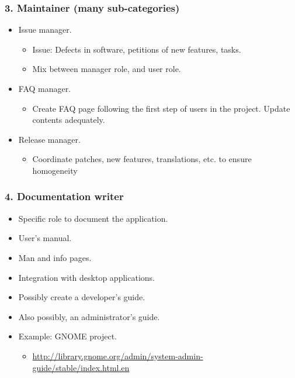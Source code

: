 \documentclass{beamer}
\begin{document}
\begin{frame}
 \frametitle{3. Maintainer (many sub-categories)}
  \begin{itemize}
   \item Issue manager.
    \begin{itemize}
    \item Issue: Defects in software, petitions of new features, tasks.
    \item Mix between manager role, and user role.
    \end{itemize}
   \item FAQ manager.
    \begin{itemize}
     \item Create FAQ page following the first step of users in the project. Update contents adequately.
    \end{itemize}
   \item Release manager.
    \begin{itemize}
     \item Coordinate patches, new features, translations, etc. to ensure homogeneity
    \end{itemize}

  \end{itemize}

\end{frame}


\begin{frame}
 \frametitle{4. Documentation writer}
 \begin{itemize}
  \item Specific role to document the application.
  \item User's manual.
  \item Man and info pages.
  \item Integration with desktop applications.
  \item Possibly create a developer's guide.
  \item Also possibly, an administrator's guide.
  \item Example: GNOME project.
  \begin{itemize}
   \item \url{http://library.gnome.org/admin/system-admin-guide/stable/index.html.en}
  \end{itemize}

 \end{itemize}

\end{frame}
\end{document}
